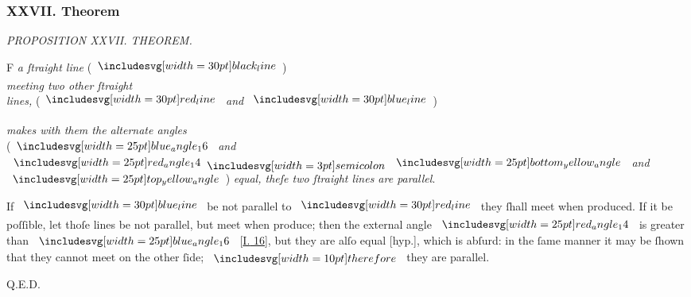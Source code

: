 \documentclass[11pt,preview]{standalone}
\begin{document}
\subsubsection{XXVII. Theorem}

\hfill

\begin{minipage}[t]{0.43\textwidth}
    \vspace{20pt}
    
\end{minipage}%
\hfill
\begin{minipage}[t]{0.54\textwidth}
    \begin{center}
        \textit{PROPOSITION XXVII. THEOREM.}\label{book1pr27} \\
    \end{center}

    \hfill

    \begin{center}
        \raggedright \lettrine[lines=3, loversize=1, nindent=0pt]{}{}F \textit{a ſtraight line} (\hspace{-1ex}$\blackline$\hspace{-1ex})\\ \textit{meeting two other ſtraight\\ lines,} (\hspace{-1ex}$\redline$ \textit{and} $\blueline$\hspace{-1ex})
    \end{center}
    \textit{makes with them the alternate angles}\\ (\hspace{-1ex}$\img{blue_angle_16}$ \textit{and} $\img{red_angle_14} \bsemicolon \img{bottom_yellow_angle}$ \textit{and} $\img{top_yellow_angle}$\hspace{-1ex}) \textit{equal, theſe two ſtraight lines are parallel}.
\end{minipage}

\hfill

\hfill

\raggedright If $\blueline$ be not parallel to $\redline$ they ſhall meet when produced. If it be poſſible, let thoſe lines be not parallel, but meet when produce; then the external angle $\img{red_angle_14}$ is greater than $\img{blue_angle_16}$ [\hyperref[book1pr16]{\textsc{I.} 16}], but they are alſo equal [hyp.], which is abſurd: in the ſame manner it may be ſhown that they cannot meet on the other ſide; $\btherefore$ they are parallel.

\hfill

\hfill Q.E.D.
\end{document}
